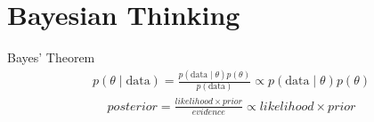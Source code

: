 \section{Bayesian Thinking}

%

\begin{frame}{Bayes' Theorem}
  \Large{
    \begin{align*}
      p(\theta \mid \text{data}) = \frac{p(\text{data} \mid \theta) p(\theta)}{p(\text{data})} \propto p(\text{data} \mid \theta) p(\theta)
    \end{align*}\pause
    \vfill
    \begin{align*}
      posterior = \frac{likelihood \times prior}{evidence} \propto likelihood \times prior
    \end{align*}
  }
\end{frame}


